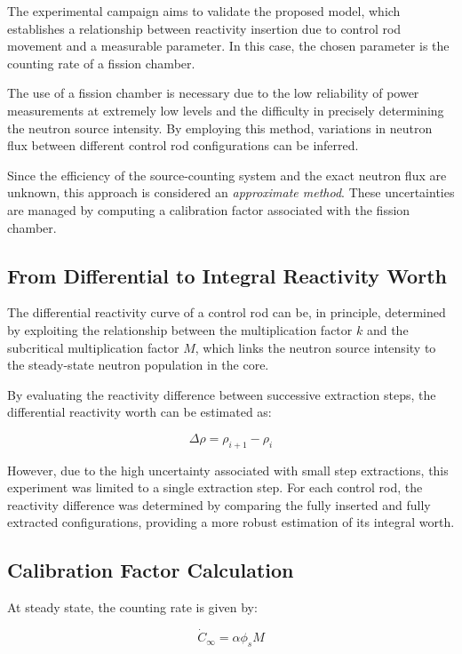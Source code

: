 The experimental campaign aims to validate the proposed model, which establishes a relationship between reactivity insertion due to control rod movement and a measurable parameter. In this case, the chosen parameter is the counting rate of a fission chamber.

The use of a fission chamber is necessary due to the low reliability of power measurements at extremely low levels and the difficulty in precisely determining the neutron source intensity. By employing this method, variations in neutron flux between different control rod configurations can be inferred.

Since the efficiency of the source-counting system and the exact neutron flux are unknown, this approach is considered an \textit{approximate method}. These uncertainties are managed by computing a calibration factor associated with the fission chamber.
\subsection{From Differential to Integral Reactivity Worth}

The differential reactivity curve of a control rod can be, in principle, determined by exploiting the relationship between the multiplication factor $k$ and the subcritical multiplication factor $M$, which links the neutron source intensity to the steady-state neutron population in the core.

By evaluating the reactivity difference between successive extraction steps, the differential reactivity worth can be estimated as:

\begin{equation}
\Delta \rho = \rho_{i+1} - \rho_i
\end{equation}

However, due to the high uncertainty associated with small step extractions, this experiment was limited to a single extraction step. For each control rod, the reactivity difference was determined by comparing the fully inserted and fully extracted configurations, providing a more robust estimation of its integral worth.

\subsection{Calibration Factor Calculation}

At steady state, the counting rate is given by:

\begin{equation}
\dot{C}_{\infty} = \alpha \phi_s M
\end{equation}

